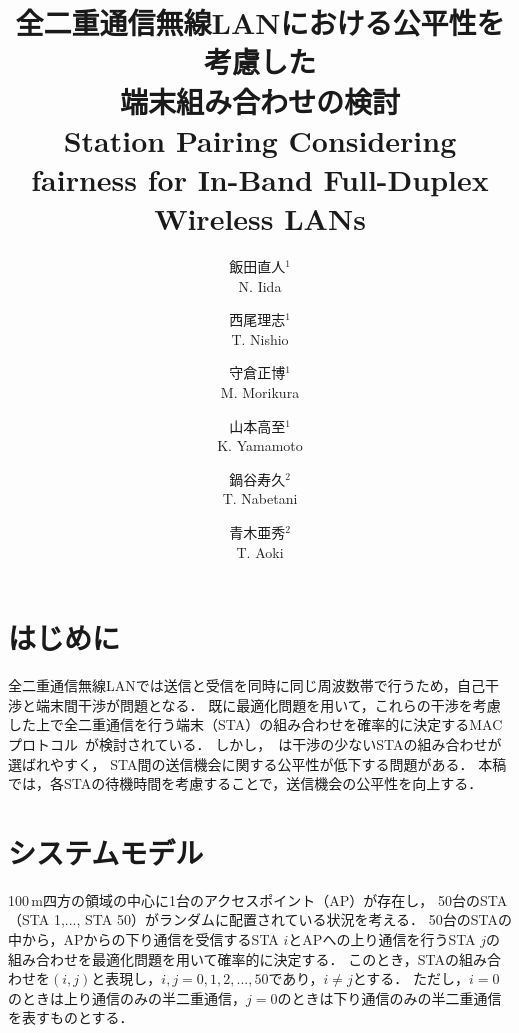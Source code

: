 \documentclass[twocolumn, a4paper]{ieicejsp}
\title{
{\bf 全二重通信無線LANにおける公平性を考慮した\\端末組み合わせの検討}
{\normalsize \\Station Pairing Considering fairness for In-Band Full-Duplex Wireless LANs}
}
\author{
{飯田直人$^1$} \\ {N. Iida} \and
{西尾理志$^1$} \\ {T. Nishio} \and
{守倉正博$^1$} \\ {M. Morikura} \and
{山本高至$^1$} \\ {K. Yamamoto} \and
{鍋谷寿久$^2$} \\ {T. Nabetani} \and
{青木亜秀$^2$} \\ {T. Aoki}
}
\begin{document}
\maketitle
\section{はじめに}
全二重通信無線LANでは送信と受信を同時に同じ周波数帯で行うため，自己干渉と端末間干渉が問題となる．
既に最適化問題を用いて，これらの干渉を考慮した上で全二重通信を行う端末（STA）の組み合わせを確率的に決定するMACプロトコル~\cite{promac}が検討されている．
しかし，~\cite{promac}は干渉の少ないSTAの組み合わせが選ばれやすく，
STA間の送信機会に関する公平性が低下する問題がある．
本稿では，各STAの待機時間を考慮することで，送信機会の公平性を向上する．

\section{システムモデル\label{モデル}}
100\,m四方の領域の中心に1台のアクセスポイント（AP）が存在し，
50台のSTA（STA 1,..., STA 50）がランダムに配置されている状況を考える．
50台のSTAの中から，APからの下り通信を受信するSTA $i$とAPへの上り通信を行うSTA $j$の組み合わせを最適化問題を用いて確率的に決定する．
このとき，STAの組み合わせを$(i,j)$と表現し，$i, j = 0, 1, 2,...,50$であり，$i\neq j$とする．
ただし，$i=0$のときは上り通信のみの半二重通信，$j=0$のときは下り通信のみの半二重通信を表すものとする．
\end{document}
